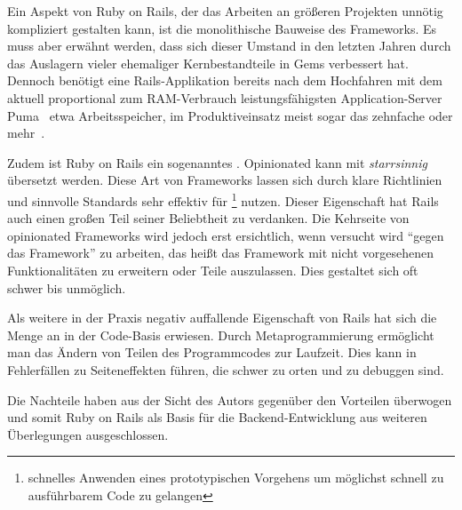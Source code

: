 Ein Aspekt von Ruby on Rails, der das Arbeiten an größeren Projekten unnötig
kompliziert gestalten kann, ist die monolithische Bauweise des Frameworks.  Es
muss aber erwähnt werden, dass sich dieser Umstand in den letzten Jahren durch
das Auslagern vieler ehemaliger Kernbestandteile in Gems verbessert hat.
Dennoch benötigt eine Rails-Applikation bereits nach dem Hochfahren mit dem
aktuell proportional zum RAM-Verbrauch leistungsfähigsten Application-Server
Puma~\cite{puma} etwa  Arbeitsspeicher, im Produktiveinsatz meist
sogar das zehnfache oder mehr~\cite{railsappservercomparison}.

Zudem ist Ruby on Rails ein sogenanntes .
Opinionated kann mit \emph{starrsinnig} übersetzt werden.  Diese Art von
Frameworks lassen sich durch klare Richtlinien und sinnvolle Standards sehr
effektiv für \footnote{schnelles
Anwenden eines prototypischen Vorgehens um möglichst schnell zu ausführbarem
Code zu gelangen} nutzen. Dieser Eigenschaft hat Rails auch einen großen Teil
seiner Beliebtheit zu verdanken.  Die Kehrseite von opinionated Frameworks wird
jedoch erst ersichtlich, wenn versucht wird \enquote{gegen das Framework} zu
arbeiten, das heißt das Framework mit nicht vorgesehenen Funktionalitäten zu
erweitern oder Teile auszulassen.  Dies gestaltet sich oft schwer bis
unmöglich.

Als weitere in der Praxis negativ auffallende Eigenschaft von Rails hat
sich die Menge an  in der Code-Basis erwiesen.
Durch Metaprogrammierung ermöglicht man das Ändern von Teilen des Programmcodes
zur Laufzeit. Dies kann in Fehlerfällen zu Seiteneffekten führen, die schwer zu
orten und zu debuggen sind.

Die Nachteile haben aus der Sicht des Autors gegenüber den Vorteilen überwogen
und somit Ruby on Rails als Basis für die Backend-Entwicklung aus weiteren
Überlegungen ausgeschlossen.
